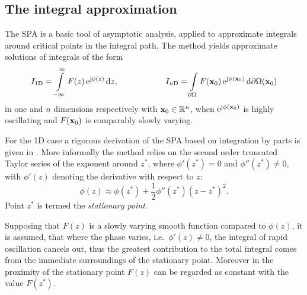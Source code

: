 \subsection{The integral approximation}
%
The SPA is a basic tool of asymptotic analysis, applied to approximate integrals around critical points in the integral path.
The method yields approximate solutions of integrals of the form
\begin{equation}
\label{Eq:SPAintegral_1d_nd}
I_{1\mathrm{D}} = \int\limits_{-\infty}^{\infty} F(z) \, \te^{\ti \phi(z)} \, \td z,
\hspace{20mm} 
I_{n\mathrm{D}} = \int\limits_{\dO} F(\vxo) \, \te^{\ti \phi(\vxo)} \, \td \dO(\vxo)
\end{equation}
in one and $n$ dimensions respectively with $\mathbf{x}_0 \in \mathbb{R}^{n}$, when $\mathrm{e}^{\mathrm{j} \phi(\mathbf{x}_0)}$ is highly oscillating and $F(\mathbf{x}_0)$ is comparably slowly varying.


For the 1D case a rigorous derivation of the SPA based on integration by parts is given in \cite{Bleistein1984, Blenstein1975, Williams1999}.
More informally the method relies on the second order truncated Taylor series of the exponent around $z^*$, where $\phi'(z^*) = 0$ and $\phi''(z^*) \neq 0$, with $\phi'(z)$ denoting the derivative with respect to $z$:
\begin{equation}
\phi(z) \approx \phi(z^*) + \frac{1}{2}\phi''(z^*)(z-z^*)^2.
\end{equation}
Point $z^*$ is termed the \emph{stationary point}.

Supposing that $F(z)$ is a slowly varying smooth function compared to $\phi(z)$, it is assumed, that where the phase varies, i.e.\ $\phi'(z) \neq 0$, the integral of rapid oscillation cancels out, thus the greatest contribution to the total integral comes from the immediate surroundings of the stationary point.
Moreover in the proximity of the stationary point $F(z)$ can be regarded as constant with the value $F(z^*)$.

